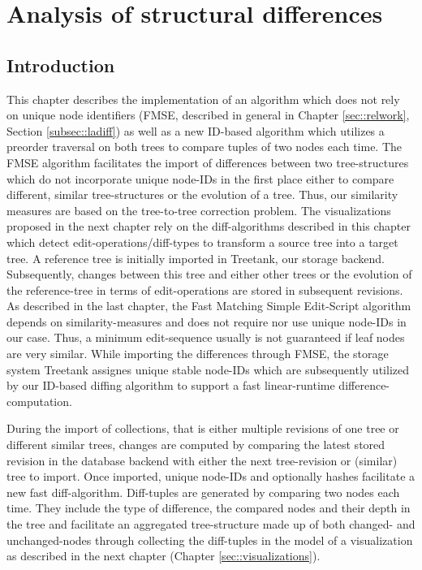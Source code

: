 \section{Analysis of structural differences}\label{sec::differences}
\subsection{Introduction}
This chapter describes the implementation of an algorithm which does not rely on unique node identifiers (FMSE, described in general in Chapter \ref{sec::relwork}, Section \ref{subsec::ladiff}) as well as a new ID-based algorithm which utilizes a preorder traversal on both trees to compare tuples of two nodes each time. The FMSE algorithm facilitates the import of differences between two tree-structures which do not incorporate unique node-IDs in the first place either to compare different, similar tree-structures or the evolution of a tree. Thus, our similarity measures are based on the tree-to-tree correction problem. The visualizations proposed in the next chapter rely on the diff-algorithms described in this chapter which detect edit-operations/diff-types to transform a source tree into a target tree. A reference tree is initially imported in Treetank, our storage backend. Subsequently, changes between this tree and either other trees or the evolution of the reference-tree in terms of edit-operations are stored in subsequent revisions. As described in the last chapter, the Fast Matching Simple Edit-Script algorithm depends on similarity-measures and does not require nor use unique node-IDs in our case. Thus, a minimum edit-sequence usually is not guaranteed if leaf nodes are very similar. While importing the differences through FMSE, the storage system Treetank assignes unique stable node-IDs which are subsequently utilized by our ID-based diffing algorithm to support a fast linear-runtime difference-computation.

During the import of collections, that is either multiple revisions of one tree or different similar trees, changes are computed by comparing the latest stored revision in the database backend with either the next tree-revision or (similar) tree to import. Once imported, unique node-IDs and optionally hashes facilitate a new fast diff-algorithm. Diff-tuples are generated by comparing two nodes each time. They include the type of difference, the compared nodes and their depth in the tree and facilitate an aggregated tree-structure made up of both changed- and unchanged-nodes through collecting the diff-tuples in the model of a visualization as described in the next chapter (Chapter \ref{sec::visualizations}). 

